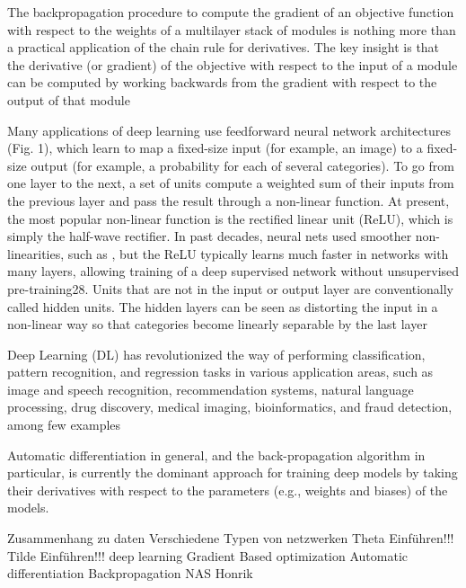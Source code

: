 The backpropagation procedure to compute the gradient of an objective function with respect to the weights of a multilayer stack of modules is nothing more than a practical application of the chain rule for derivatives. The key insight is that the derivative (or gradient) of the objective with respect to the input of a module can be computed by working backwards from the gradient with respect to the output of that module

Many applications of deep learning use feedforward neural network architectures (Fig. 1), which learn to map a fixed-size input (for example, an image) to a fixed-size output (for example, a probability for each of several categories). To go from one layer to the next, a set of units compute a weighted sum of their inputs from the previous layer and pass the result through a non-linear function. At present, the most popular non-linear function is the rectified linear unit (ReLU), which is simply the half-wave rectifier. In past decades, neural nets used smoother non-linearities, such as , but the ReLU typically learns much faster in networks with many layers, allowing training of a deep supervised network without unsupervised pre-training28. Units that are not in the input or output layer are conventionally called hidden units. The hidden layers can be seen as distorting the input in a non-linear way so that categories become linearly separable by the last layer 

Deep Learning (DL) has revolutionized the way of performing classification, pattern recognition, and regression
tasks in various application areas, such as image and speech recognition, recommendation systems, natural language
processing, drug discovery, medical imaging, bioinformatics, and fraud detection, among few examples

Automatic differentiation in general, and the back-propagation algorithm in particular, is currently the dominant approach for training deep models by taking their derivatives with respect to the parameters (e.g., weights and biases) of the models.


Zusammenhang zu daten
Verschiedene Typen von netzwerken
Theta Einführen!!!
Tilde Einführen!!!
deep learning
Gradient Based optimization
Automatic differentiation
Backpropagation 
NAS
Honrik 